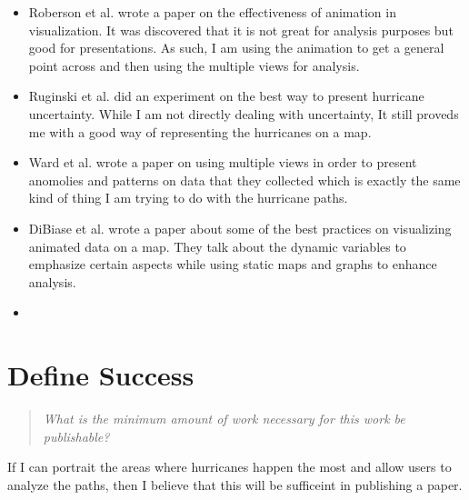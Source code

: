 \documentclass{proc}
\begin{document}
\begin{itemize}
\item Roberson et al. wrote a paper on the effectiveness of animation in visualization. It was discovered that it is not great for analysis purposes but good for presentations. As such, I am using the animation to get a general point across and then using the multiple views for analysis. \cite{robertson2008effectiveness}
\item Ruginski et al. did an experiment on the best way to present hurricane uncertainty. While I am not directly dealing with uncertainty, It still proveds me with a good way of representing the hurricanes on a map. \cite{ruginski2016non}
\item Ward et al. wrote a paper on using multiple views in order to present anomolies and patterns on data that they collected which is exactly the same kind of thing I am trying to do with the hurricane paths. \cite{ward1994xmdvtool}
\item DiBiase et al. wrote a paper about some of the best practices on visualizing animated data on a map. They talk about the dynamic variables to emphasize certain aspects while using static maps and graphs to enhance analysis.
\item
\end{itemize}

\section{Define Success}
\begin{quote}
\textit{What is the minimum amount of work necessary for this work be publishable?}
\end{quote}

If I can portrait the areas where hurricanes happen the most and allow users to analyze the paths, then I believe that this will be sufficeint in publishing a paper. 



\end{document}
